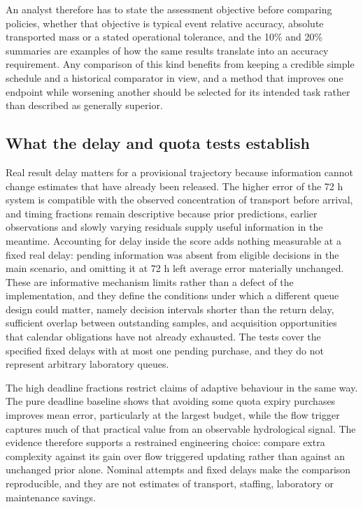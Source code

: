 \documentclass[pdflatex,sn-mathphys-num]{sn-jnl}%
\theoremstyle{thmstyleone}%
\theoremstyle{thmstyletwo}%
\theoremstyle{thmstylethree}%
\begin{document}
An analyst therefore has to state the assessment objective before comparing policies, whether that objective is typical event relative accuracy, absolute transported mass or a stated operational tolerance, and the 10\% and 20\% summaries are examples of how the same results translate into an accuracy requirement. Any comparison of this kind benefits from keeping a credible simple schedule and a historical comparator in view, and a method that improves one endpoint while worsening another should be selected for its intended task rather than described as generally superior.

\subsection{What the delay and quota tests establish}

Real result delay matters for a provisional trajectory because information cannot change estimates that have already been released. The higher error of the 72 h system is compatible with the observed concentration of transport before arrival, and timing fractions remain descriptive because prior predictions, earlier observations and slowly varying residuals supply useful information in the meantime. Accounting for delay inside the score adds nothing measurable at a fixed real delay: pending information was absent from eligible decisions in the main scenario, and omitting it at 72 h left average error materially unchanged. These are informative mechanism limits rather than a defect of the implementation, and they define the conditions under which a different queue design could matter, namely decision intervals shorter than the return delay, sufficient overlap between outstanding samples, and acquisition opportunities that calendar obligations have not already exhausted. The tests cover the specified fixed delays with at most one pending purchase, and they do not represent arbitrary laboratory queues.

The high deadline fractions restrict claims of adaptive behaviour in the same way. The pure deadline baseline shows that avoiding some quota expiry purchases improves mean error, particularly at the largest budget, while the flow trigger captures much of that practical value from an observable hydrological signal. The evidence therefore supports a restrained engineering choice: compare extra complexity against its gain over flow triggered updating rather than against an unchanged prior alone. Nominal attempts and fixed delays make the comparison reproducible, and they are not estimates of transport, staffing, laboratory or maintenance savings.
\end{document}
